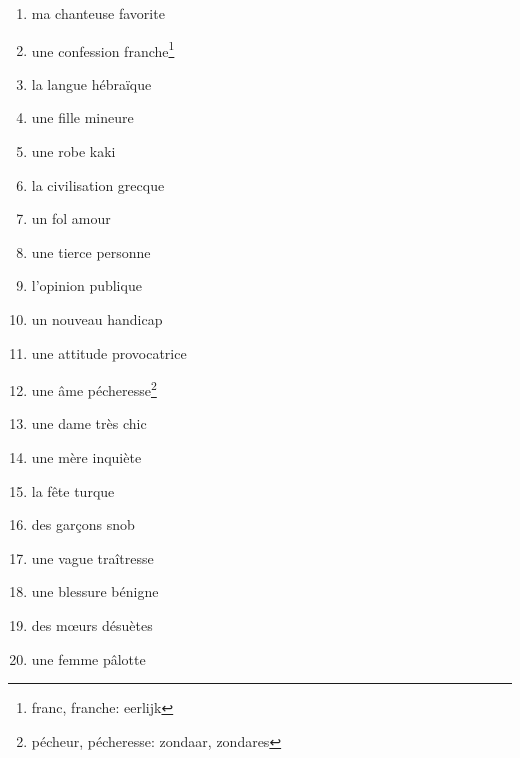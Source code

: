\documentclass[11pt, french]{report}
\begin{document}
\vfill

\begin{enumerate}
\item ma chanteuse favorite
\item une confession franche\footnote{franc, franche: eerlijk}
\item la langue hébraïque
\item une fille mineure
\item une robe kaki
\item la civilisation grecque
\item un fol amour
\item une tierce personne
\item l'opinion publique
\item un nouveau handicap
\item une attitude provocatrice
\item une âme pécheresse\footnote{pécheur, pécheresse: zondaar, zondares}
\item une dame très chic
\item une mère inquiète
\item la fête turque
\item des garçons snob
\item une vague traîtresse
\item une blessure bénigne
\item des mœurs désuètes
\item une femme pâlotte
\end{enumerate}
\end{document}
